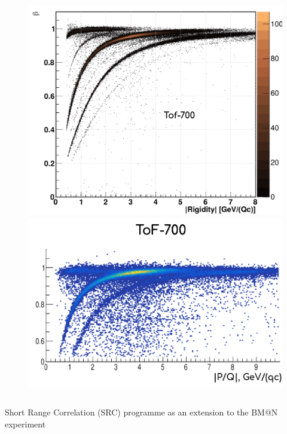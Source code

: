\documentclass[dvipsnames] {beamer}
\begin{document}
\begin{frame}
\begin{columns}[t]
\begin{block}{}
\begin{figure}[H]
         \includegraphics[width=1.\linewidth]{pid_tof700_sim.png}
         \includegraphics[width=1.\linewidth]{pid_exp_tof700.png}
       \end{figure}
    \end{block}   
  \end{columns}
  
\end{frame}


\begin{frame}
 \bf
  \begin{block}{}
    \begin{center}
      {\Huge Short Range Correlation (SRC) programme as an
        extension to the BM@N experiment}
    \end{center}
  \end{block}  
\end{frame}
\end{document}
